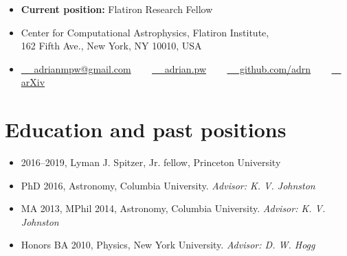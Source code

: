 \documentclass[12pt, letterpaper]{apw-cv}
\begin{document}
\thispagestyle{empty}\sloppy\sloppypar




\begin{itemize}
  \item \textbf{Current position:} Flatiron Research Fellow
  \item Center for Computational Astrophysics, Flatiron Institute, \\ 162 Fifth Ave., New York, NY 10010, USA
  \item
    \href{mailto:adrianmpw@gmail.com}{\faEnvelope ~~ adrianmpw@gmail.com}
    ~~~
	\href{http://adrian.pw}{\faExternalLink* ~~ adrian.pw}
    ~~~
	\href{https://github.com/adrn}{\faGithub ~~ github.com/adrn}
    ~~~
    \href{\arxivurl}{\faFile ~~ arXiv}
\end{itemize}




\section*{Education and past positions}
	\begin{itemize}
        \item 2016--2019, Lyman J. Spitzer, Jr. fellow, Princeton University
	\item PhD 2016, Astronomy, Columbia University.
		{\it Advisor: K. V. Johnston}
	\item MA 2013, MPhil 2014, Astronomy, Columbia University.
		{\it Advisor: K. V. Johnston}
	\item Honors BA 2010, Physics, New York University.
		{\it Advisor: D. W. Hogg}
	\end{itemize}
\end{document}
